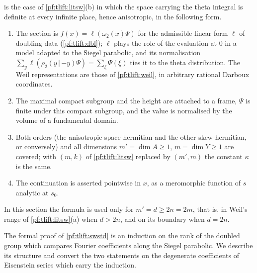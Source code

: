 \begin{remark}\label{pf:tlift:remsw}
 is the case of \cref{pf:tlift:litsw}(b) in which the space carrying the theta integral is
definite at every infinite place, hence anisotropic, in the following form.
\begin{enumerate}[label=(\alph*),nosep]
\item The section is $f(x)=\ell(\omega_2(x)\Psi)$ for the admissible linear form $\ell$ of doubling data
  (\cref{pf:tlift:dbl}); $\ell$ plays the role of the evaluation at $0$ in a model adapted to the Siegel parabolic,
  and its normalisation $\sum_y\ell(\rho_2(y\,|\,{-y})\Psi)=\sum_\xi\Psi(\xi)$ ties it to the theta distribution. The
  Weil representations are those of \cref{pf:tlift:weil}, in arbitrary rational Darboux coordinates.
\item The maximal compact subgroup and the height are attached to a frame, $\Psi$ is finite under this compact
  subgroup, and the value is normalised by the volume of a fundamental domain.
\item Both orders (the anisotropic space hermitian and the other skew-hermitian, or conversely) and all dimensions
  $m'=\dim A\ge1$, $m=\dim Y\ge1$ are covered; with $(m,k)$ of \cref{pf:tlift:litsw} replaced by $(m',m)$ the
  constant $\kappa$ is the same.
\item The continuation is asserted pointwise in $x$, as a meromorphic function of $s$ analytic at $s_0$.
\end{enumerate}
In this section the formula is used only for $m'=d\ge2n=2m$, that is, in Weil's range of \cref{pf:tlift:litsw}(a) when
$d>2n$, and on its boundary when $d=2n$.
\end{remark}

The formal proof of \cref{pf:tlift:swstd} is an induction on the rank of the doubled group which compares Fourier
coefficients along the Siegel parabolic. We describe its structure and convert the two statements on the
degenerate coefficients of Eisenstein series which carry the induction.


